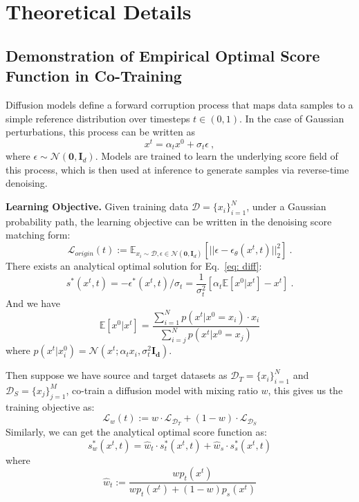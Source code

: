 \section{Theoretical Details}

\subsection{Demonstration of Empirical Optimal Score Function in Co-Training}
\label{appdx: demonstration}
Diffusion models define a forward corruption process that maps data samples to a simple reference distribution over timesteps $t \in (0,1)$.
In the case of Gaussian perturbations, this process can be written as
\[
x^t = \alpha_t x^0 + \sigma_t \epsilon~,
\]
where $\epsilon \sim \mathcal{N}(\mathbf{0}, \mathbf{I}_d)$.
Models are trained to learn the underlying score field of this process, which is then used at inference to generate samples via reverse-time denoising.

\textbf{Learning Objective.} 
Given training data $\mathcal{D} = \{ x_i\}_{i=1}^N$, under a Gaussian probability path, the learning objective can be written in the denoising score matching form:
\begin{equation}
\label{eq: diff}
    \mathcal{L}_{origin}(t) := \mathbb{E}_{x_i \sim \mathcal{D}, \epsilon \in \mathcal{N}(\mathbf{0}, \mathbf{I}_d)} [||\epsilon - \epsilon_\theta(x^t, t)||_2^2]~.
\end{equation}
There exists an analytical optimal solution for Eq.~\eqref{eq: diff}:
\begin{equation}
    s^*(x^t,t)=-\epsilon^*(x^t,t)/\sigma_t = \frac{1}{\sigma_t^2}[\alpha_t\mathbb{E}[x^0|x^t] - x^t]~.
\end{equation}
And we have
\begin{equation}
    \mathbb{E}[x^0|x^t] = \frac{\sum_{i=1}^N p(x^t|x^0=x_i) \cdot x_i}{\sum_{i=j}^N p(x^t|x^0=x_j)}
\label{eq: expection}
\end{equation}
where $p(x^t|x_i^0) = \mathcal{N}(x^t;\alpha_tx_i,\sigma_t^2\mathbf{I_d})$.

Then suppose we have source and target datasets as $\mathcal{D}_T=\{x_i\}_{i=1}^N$ and $\mathcal{D}_S=\{x_j\}_{j=1}^M$, co-train a diffusion model with mixing ratio $w$, this gives us the training objective as:
\begin{equation}
    \mathcal{L}_{w}(t) := w \cdot \mathcal{L}_{\mathcal{D}_T} + (1-w) \cdot \mathcal{L}_{\mathcal{D}_S}
\end{equation}
Similarly, we can get the analytical optimal score function as:
\begin{equation}
    s_w^*(x^t, t) = \hat{w}_t \cdot s_t^*(x^t,t) + \hat{w}_s \cdot s_s^*(x^t,t)
\label{eq: merged score}
\end{equation}
where 
\begin{equation}
    \hat{w}_t := \frac{w p_t(x^t)}{w p_t(x^t) + (1-w) p_s(x^t)}
\end{equation}

